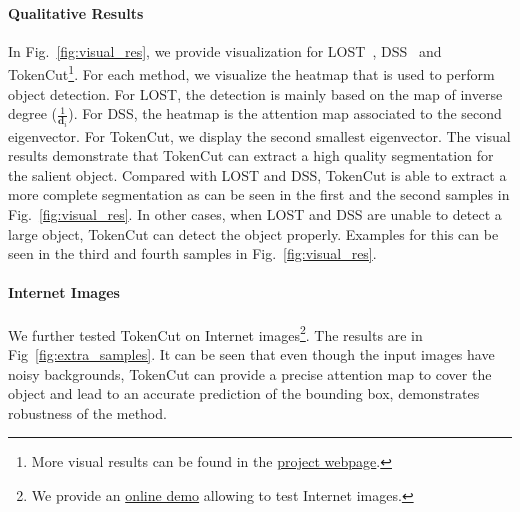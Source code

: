 \documentclass[twocolumn]{article}
\newcommand{\name} {TokenCut}
\newcommand{\degree}{\mathbf{d}}
\begin{document}
\paragraph*{Qualitative Results}
 In Fig.~\ref{fig:visual_res}, we provide visualization for LOST~\cite{simeoni2021localizing}, DSS~\cite{melaskyriazi2022deep} and  {\name}\footnote{More visual results can be found in the \href{https://www.m-psi.fr/Papers/TokenCut2022/}{project webpage}.}. For each method, we visualize the heatmap that is used to perform object detection. For LOST, the detection is mainly based on the map of inverse degree ($\frac{1}{\degree_i}$). For DSS, the heatmap is the attention map associated to the second eigenvector. For {\name}, we display the second smallest eigenvector.  The visual results demonstrate that  {\name} can extract a high quality segmentation for the salient object. Compared with LOST and DSS, {\name} is able to extract a more complete segmentation as can be seen in the first and the second samples in Fig.~\ref{fig:visual_res}. In other cases, when LOST and DSS are unable to detect a large object, {\name} can detect the object properly. Examples for this can be seen in the third and fourth samples in Fig.~\ref{fig:visual_res}. 

\paragraph*{Internet Images} We further tested {\name} on Internet images\footnote{We provide an \href{https://huggingface.co/spaces/yangtaowang/TokenCut}{online demo} allowing to test Internet images.}. The results are in Fig~\ref{fig:extra_samples}.  It can be seen that even though the input images have noisy backgrounds, {\name} can  provide a precise attention map to cover the object and lead to an accurate prediction of the bounding box, demonstrates robustness of the method.
\end{document}
